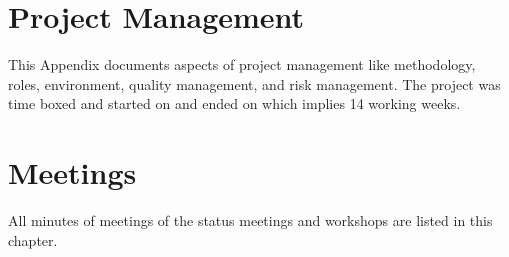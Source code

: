 \documentclass[hsr-ba,english]{hgbthesis}
\begin{document}
\appendix

\chapter{Project Management}
\label{cha:projectmgmt}

This Appendix documents aspects of project management like methodology, roles, environment, quality management, and risk management. The project was time boxed and started on  and ended on  which implies 14 working weeks. 






\chapter{Meetings}

All minutes of meetings of the status meetings and workshops are listed in
this chapter.




%
%


%



\printglossaries


\MakeBibliography
\end{document}
